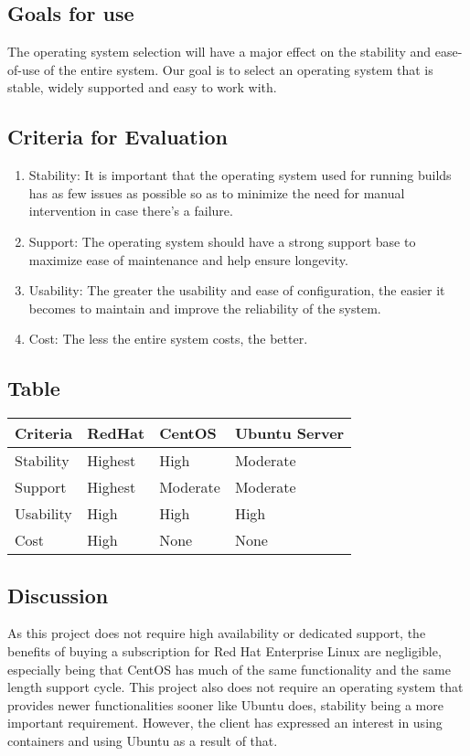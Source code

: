\documentclass[10pt,letterpaper,onecolumn,journal]{IEEEtran}
\begin{document}
\subsection{Goals for use}
The operating system  selection will have a major effect on the stability and ease-of-use of the entire system. Our goal is to select an operating system that is stable, widely supported and easy to work with.
\subsection{Criteria for Evaluation}
\begin{enumerate}
  \item Stability: It is important that the operating system used for running builds has as few issues as possible so as to minimize the need for manual intervention in case there's a failure.
  \item Support: The operating system should have a strong support base to maximize ease of maintenance and help ensure longevity.
  \item Usability: The greater the usability and ease of configuration, the easier it becomes to maintain and improve the reliability of the system.
  \item Cost: The less the entire system costs, the better.
\end{enumerate}
\subsection{Table}
\begin{center}
  \begin{tabular}{llll}
    Criteria & RedHat & CentOS & Ubuntu Server \\ \midrule
    Stability       & Highest & High & Moderate \\ \midrule
    Support           & Highest & Moderate & Moderate \\ \midrule
    Usability       & High & High & High \\ \midrule
    Cost       & High & None & None \\ \bottomrule
  \end{tabular}
\end{center}
\subsection{Discussion}
As this project does not require high availability or dedicated support, the benefits of buying a subscription for Red Hat Enterprise Linux are negligible, especially being that CentOS has much of the same functionality and the same length support cycle. This project also does not require an operating system that provides newer functionalities sooner like Ubuntu does, stability being a more important requirement. However, the client has expressed an interest in using containers and using Ubuntu as a result of that.
\end{document}

